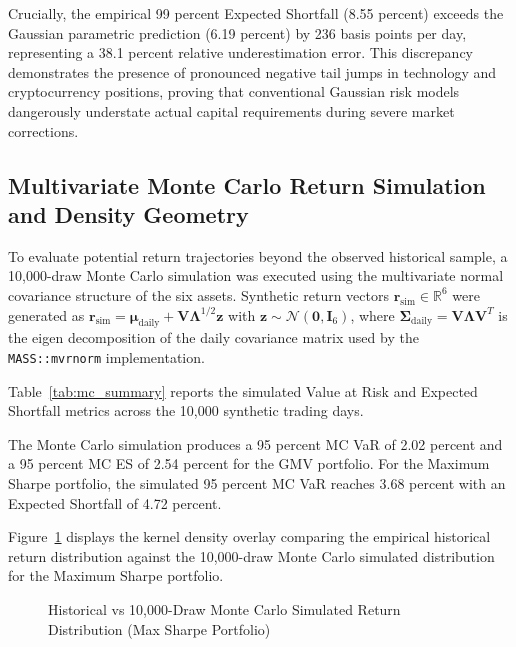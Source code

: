 Crucially, the empirical 99 percent Expected Shortfall (8.55 percent) exceeds the Gaussian parametric prediction (6.19 percent) by 236 basis points per day, representing a 38.1 percent relative underestimation error. This discrepancy demonstrates the presence of pronounced negative tail jumps in technology and cryptocurrency positions, proving that conventional Gaussian risk models dangerously understate actual capital requirements during severe market corrections.

\subsection{Multivariate Monte Carlo Return Simulation and Density Geometry}

To evaluate potential return trajectories beyond the observed historical sample, a 10,000-draw Monte Carlo simulation was executed using the multivariate normal covariance structure of the six assets. Synthetic return vectors $\mathbf{r}_{\text{sim}} \in \mathbb{R}^6$ were generated as $\mathbf{r}_{\text{sim}} = \boldsymbol{\mu}_{\text{daily}} + \mathbf{V} \boldsymbol{\Lambda}^{1/2} \mathbf{z}$ with $\mathbf{z} \sim \mathcal{N}(\mathbf{0}, \mathbf{I}_6)$, where $\boldsymbol{\Sigma}_{\text{daily}} = \mathbf{V} \boldsymbol{\Lambda} \mathbf{V}^T$ is the eigen decomposition of the daily covariance matrix used by the \texttt{MASS::mvrnorm} implementation.

Table~\ref{tab:mc_summary} reports the simulated Value at Risk and Expected Shortfall metrics across the 10,000 synthetic trading days.



The Monte Carlo simulation produces a 95 percent MC VaR of 2.02 percent and a 95 percent MC ES of 2.54 percent for the GMV portfolio. For the Maximum Sharpe portfolio, the simulated 95 percent MC VaR reaches 3.68 percent with an Expected Shortfall of 4.72 percent.

Figure~\ref{fig:mc_distribution} displays the kernel density overlay comparing the empirical historical return distribution against the 10,000-draw Monte Carlo simulated distribution for the Maximum Sharpe portfolio.

\begin{figure}[H]
  \centering
  \caption{Historical vs 10,000-Draw Monte Carlo Simulated Return Distribution (Max Sharpe Portfolio)}
  \label{fig:mc_distribution}
\end{figure}

